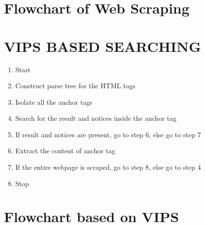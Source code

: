 \section*{Flowchart of Web Scraping}
\section*{VIPS BASED SEARCHING}
\begin{enumerate}
\item Start
\item Construct parse tree for the HTML tags
\item Isolate all the anchor tags
\item Search for the result and notices inside the anchor tag
\item If result and notices are present, go to step 6, else go to step 7
\item Extract the content of anchor tag
\item If the entire webpage is scraped, go to step 8, else go to step 4
\item Stop
\end{enumerate}
\section*{Flowchart based on VIPS}
